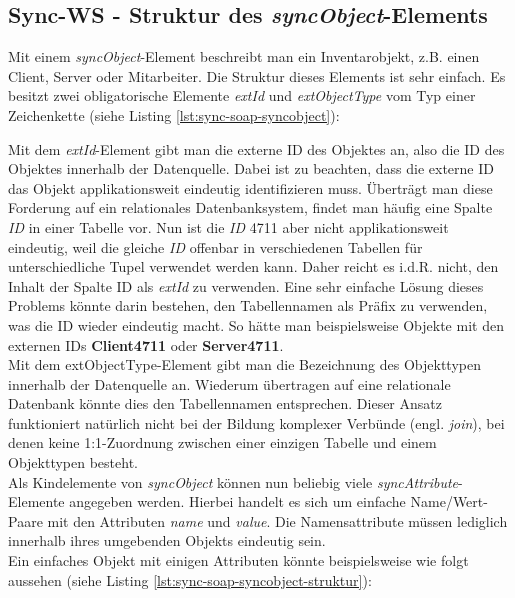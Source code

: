 \documentclass[a4paper,10pt]{book}
\begin{document}
\subsection{Sync-WS - Struktur des \textit{syncObject}-Elements}
Mit einem \textit{syncObject}-Element beschreibt man ein Inventarobjekt, z.B. einen Client, Server oder Mitarbeiter.
Die Struktur dieses Elements ist sehr einfach. Es besitzt zwei obligatorische
Elemente \textit{extId} und \textit{extObjectType} vom Typ einer Zeichenkette
(siehe Listing \ref{lst:sync-soap-syncobject}):
\newline
\lstset{language=XML}



Mit dem \textit{extId}-Element gibt man die externe ID des Objektes an, also die
ID des Objektes innerhalb der Datenquelle. Dabei ist zu beachten, dass die externe ID das Objekt applikationsweit eindeutig identifizieren muss.
Überträgt man diese Forderung auf ein relationales Datenbanksystem, findet man häufig eine Spalte \textit{ID} in
einer Tabelle vor. Nun ist die \textit{ID} 4711 aber nicht applikationsweit eindeutig, weil die gleiche \textit{ID} offenbar in verschiedenen Tabellen für unterschiedliche Tupel verwendet werden kann.
Daher reicht es i.d.R. nicht, den Inhalt der Spalte ID als \textit{extId} zu verwenden. Eine sehr einfache
Lösung dieses Problems könnte darin bestehen, den Tabellennamen als Präfix zu verwenden, was die ID wieder
eindeutig macht. So hätte man beispielsweise Objekte mit den externen IDs \textbf{Client4711} oder \textbf{Server4711}.
\newline\\
Mit dem extObjectType-Element gibt man die Bezeichnung des Objekttypen innerhalb
der Datenquelle an.
Wiederum übertragen auf eine relationale Datenbank könnte dies den Tabellennamen entsprechen. Dieser Ansatz
funktioniert natürlich nicht bei der Bildung komplexer Verbünde (engl. \textit{join}), bei denen keine 1:1-Zuordnung
zwischen einer einzigen Tabelle und einem Objekttypen besteht.
\newline\\
Als Kindelemente von \textit{syncObject} können nun beliebig viele \textit{syncAttribute}-Elemente
angegeben werden. Hierbei handelt es sich um einfache Name/Wert-Paare mit den Attributen \textit{name} und
\textit{value}. Die Namensattribute müssen lediglich innerhalb ihres umgebenden Objekts eindeutig sein.
\newline\\
Ein einfaches Objekt mit einigen Attributen könnte beispielsweise wie folgt
aussehen (siehe Listing \ref{lst:sync-soap-syncobject-struktur}):
\newline
\lstset{language=XML}

\end{document}
